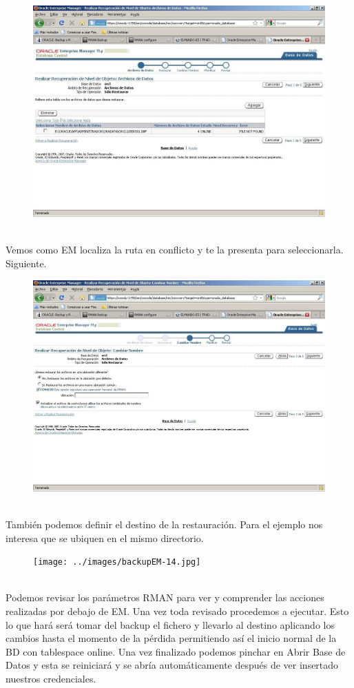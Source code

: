 \begin{figure}[h!]
\centering
\includegraphics[scale=0.8]{../images/backupEM-11.jpg}
\end{figure}
\\Vemos  como  EM  localiza  la  ruta  en  conflicto  y  te  la  presenta  para  seleccionarla. Siguiente.
\begin{figure}[h!]
\centering
\includegraphics[scale=0.8]{../images/backupEM-12.jpg}
\end{figure}
\\También podemos definir el destino de la restauración. Para el ejemplo nos interesa que se ubiquen en el mismo directorio.

\begin{figure}[h!]
\texttt{[image: ../images/backupEM-14.jpg]}
\end{figure}
\\Podemos revisar los parámetros RMAN para ver y comprender las acciones realizadas por debajo de EM. Una vez toda revisado procedemos a ejecutar.
Esto lo que hará será tomar del backup el fichero y llevarlo al destino aplicando los cambios  hasta  el  momento  de  la  pérdida  permitiendo  así  el  inicio  normal  de  la  BD  con tablespace online.
Una vez finalizado podemos pinchar en Abrir Base de Datos y esta se reiniciará y se abría automáticamente después de ver insertado nuestros credenciales.
